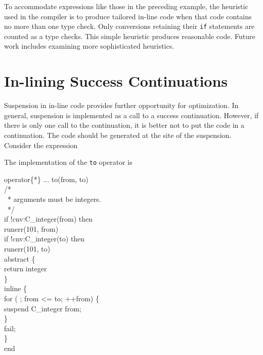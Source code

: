 To accommodate expressions like those in the preceding example, the
heuristic used in the compiler is to produce tailored in-line code
when that code contains no more than one type check. Only conversions
retaining their \texttt{if} statements are counted as a type checks. This
simple heuristic produces reasonable code. Future work includes
examining more sophisticated heuristics.


\section{In-lining Success Continuations}

Suspension in in-line code provides further opportunity for
optimization. In general, suspension is implemented as a call to a
success continuation. However, if there is only one call to the
continuation, it is better not to put the code in a continuation. The
code should be generated at the site of the suspension. Consider the
expression


\noindent
The implementation of the \texttt{to} operator is 

\goodbreak
\begin{iconcode}
\>operator\{*\} ... to(from, to)\\
\>\>/*\\
\>\>\ * arguments must be integers.\\
\>\>\ */\\
\>\>if !cnv:C\_integer(from) then\\
\>\>\>runerr(101, from)\\
\>\>if !cnv:C\_integer(to) then\\
\>\>\>runerr(101, to)\\
\>\>abstract \{\\
\>\>\>return integer\\
\>\>\>\}\\
\>\>inline \{\\
\>\>\>for ( ; from <= to; ++from) \{\\
\>\>\>\>suspend C\_integer from;\\
\>\>\>\>\}\\
\>\>\>fail;\\
\>\>\>\}\\
\>end\\
\end{iconcode}

